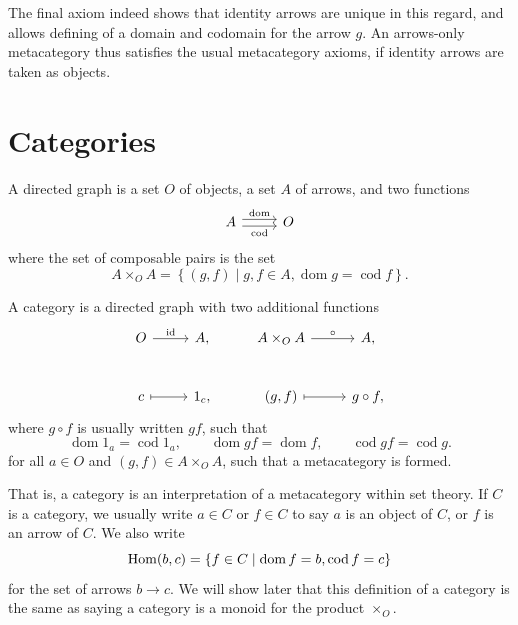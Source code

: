 The final axiom indeed shows that identity arrows are unique in this regard, and allows defining of a domain and codomain for the arrow $g$. An arrows-only metacategory thus satisfies the usual metacategory axioms, if identity arrows are taken as objects.

\section{Categories}

\begin{definition}\label{dfn:1.1}
	A directed graph is a set $O$ of objects, a set $A$ of arrows, and two functions
	\[\begin{tikzcd}[row sep = 2.5em, column sep = 2.5em]
		A\ar[r, shift left, "\text{dom} "]\ar[r, shift right, "\text{cod} "']&O
	\end{tikzcd}\]
	where the set of composable pairs is the set
	\[
		A\times_OA=\left\{ (g,f)\mid g,f\in A,\operatorname{dom} g=\operatorname{cod} f \right\} 
	.\]
\end{definition}

\begin{definition}[Category]\label{dfn:1.2}
	A category is a directed graph with two additional functions
	\[\begin{tikzcd}[row sep = 2.5em, column sep = 2.5em]
		O\ar[r, "\mathrm{id} "]&A,&A\times _OA\ar[r, "\circ "]&A,\\
		c\ar[r, mapsto]&1_c,&(g,f)\ar[r, mapsto]&g\circ f,
	\end{tikzcd}\]
	where $g\circ f$ is usually written $gf$, such that
	\[
		\operatorname{dom} 1_a=\operatorname{cod} 1_a,\qquad \operatorname{dom} gf=\operatorname{dom} f,\qquad \operatorname{cod} gf=\operatorname{cod} g
	.\]
	for all $a\in O$ and $(g,f)\in A\times _OA$, such that a metacategory is formed.
\end{definition}

That is, a category is an interpretation of a metacategory within set theory. If $C$ is a category, we usually write $a\in C$ or $f\in C$ to say $a$ is an object of $C$, or $f$ is an arrow of $C$. We also write
\[
	\operatorname{Hom}(b, c) =\left\{ f\in C\mid \operatorname{dom} f=b,\operatorname{cod} f=c \right\} 
\]
for the set of arrows $b \to c$. We will show later that this definition of a category is the same as saying a category is a monoid for the product $\times_O$.


